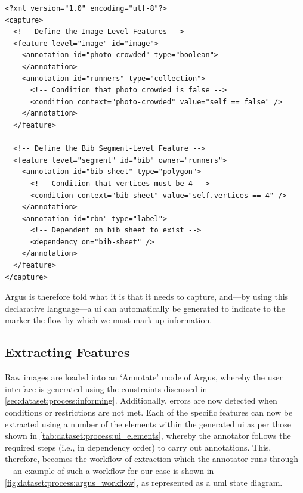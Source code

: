 \begin{lstlisting}[language=ACL, label=lst:dataset:process:acl_sample, caption={[Sample Argus Constraint Language File Format] An \glsx{acl} file describing the image-level and $BibSheet$ segment-level features as represented in an \gls{xml} schema.}]
<?xml version="1.0" encoding="utf-8"?>
<capture>
  <!-- Define the Image-Level Features -->
  <feature level="image" id="image">
    <annotation id="photo-crowded" type="boolean">
    </annotation>
    <annotation id="runners" type="collection">
      <!-- Condition that photo crowded is false -->
      <condition context="photo-crowded" value="self == false" />
    </annotation>
  </feature>
  
  <!-- Define the Bib Segment-Level Feature -->
  <feature level="segment" id="bib" owner="runners">
    <annotation id="bib-sheet" type="polygon">
      <!-- Condition that vertices must be 4 -->
      <condition context="bib-sheet" value="self.vertices == 4" />
    </annotation>
    <annotation id="rbn" type="label">
      <!-- Dependent on bib sheet to exist -->
      <dependency on="bib-sheet" />
    </annotation>
  </feature>
</capture>
\end{lstlisting}

Argus is therefore told what it is that it needs to capture, and---by using this declarative language---a \gls{ui} can automatically be generated to indicate to the marker the flow by which we must mark up information. 

\subsection{Extracting Features}
\label{sec:dataset:process:extracting}

Raw images are loaded into an `Annotate' mode of Argus, whereby the user interface is generated using the constraints discussed in \cref{sec:dataset:process:informing}. Additionally, errors are now detected when conditions or restrictions are not met. Each of the specific features can now be extracted using a number of the elements within the generated \gls{ui} as per those shown in \cref{tab:dataset:process:ui_elements}, whereby the annotator follows the required steps (i.e., in dependency order) to carry out annotations. This, therefore, becomes the workflow of extraction which the annotator runs through---an example of such a workflow for our case is shown in \cref{fig:dataset:process:argus_workflow}, as represented as a \gls{uml} state diagram.

